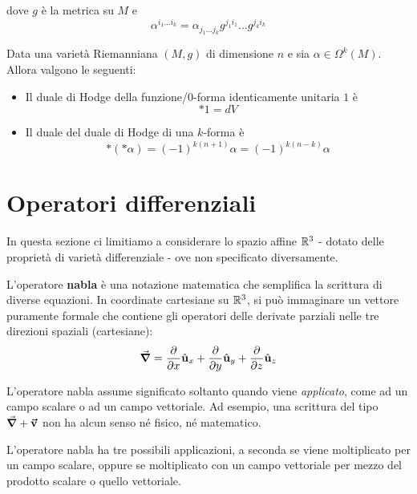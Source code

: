 dove $g$ è la metrica su $M$ e
\begin{equation*}
\alpha^{i_1\ldots i_k}=\alpha_{j_1\ldots j_k}g^{j_1i_1}\ldots g^{j_ki_k}
\end{equation*}
\begin{properties}
	Data una varietà Riemanniana $(M,g)$ di dimensione $n$ e sia $\alpha\in\Omega^k(M)$. Allora valgono le seguenti:
	\begin{itemize}
		\item Il duale di Hodge della funzione/$0$-forma identicamente unitaria $1$ è
		\begin{equation}
			\ast 1=dV
		\end{equation}
		\item Il duale del duale di Hodge di una $k$-forma è
		\begin{equation}
			\ast\left(\ast\alpha\right)=\left(-1\right)^{k\left(n+1\right)}\alpha=\left(-1\right)^{k\left(n-k\right)}\alpha
		\end{equation}
		\end{itemize}
\end{properties}
\section{Operatori differenziali}
In questa sezione ci limitiamo a considerare lo spazio affine $\mathbb{R}^3$ - dotato delle proprietà di varietà differenziale - ove non specificato diversamente.
\begin{define}
	L'operatore \textbf{nabla}	è una notazione matematica che semplifica la scrittura di diverse equazioni. In coordinate cartesiane su $\mathbb{R}^3$, si può immaginare un vettore puramente formale che contiene gli operatori delle derivate parziali nelle tre direzioni spaziali (cartesiane):
	\begin{equation}
		\grad = \pdv{x}\hat{\mathbf{u}}_x+\pdv{y}\hat{\mathbf{u}}_y+\pdv{z}\hat{\mathbf{u}}_z\label{nablacartesiano}
	\end{equation}
\end{define}
\begin{attention}
	L'operatore nabla assume significato soltanto quando viene \textit{applicato}, come ad un campo scalare o ad un campo vettoriale. Ad esempio, una scrittura del tipo $\grad + \vb*{\va{v}}$ non ha alcun senso né fisico, né matematico.
\end{attention}
L'operatore nabla ha tre possibili applicazioni, a seconda se viene moltiplicato per un campo scalare, oppure se moltiplicato con un campo vettoriale per mezzo del prodotto scalare o quello vettoriale.
